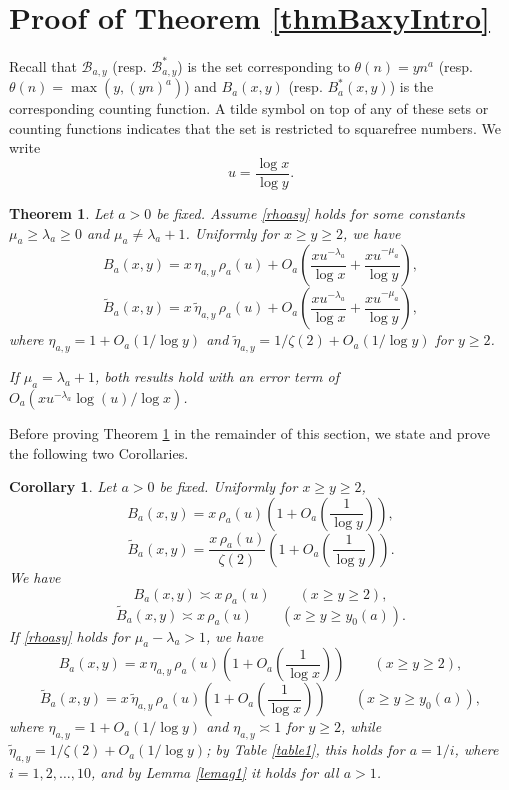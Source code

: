 \documentclass[11pt]{amsart}
\newtheorem{theorem}{Theorem}
\newtheorem{corollary}{Corollary}
\begin{document}
\section{Proof of Theorem \ref{thmBaxyIntro}}\label{secBaxy}
Recall that  $\mathcal{B}_{a,y}$ (resp. $\mathcal{B}^*_{a,y}$)  is the set corresponding to $\theta(n) = y n^{a}$ (resp. $\theta(n) = \max(y, (yn)^{a})$) and $B_{a}(x,y)$ (resp. $B^*_{a}(x,y)$) is the corresponding counting function.
A tilde symbol on top of any of these sets or counting functions indicates that the set is restricted to squarefree numbers. 
We write
$$
u=\frac{\log x}{\log y}.
$$

\begin{theorem}\label{thmBaxy}
Let $a>0$ be fixed. Assume \eqref{rhoasy} holds for some constants $\mu_a \ge \lambda_a \ge 0$ and $\mu_a\neq \lambda_a+1$. 
Uniformly for $x\ge y\ge 2$, we have
$$
B_a(x,y) = x \, \eta_{a,y} \, \rho_a(u) +O_a\left(\frac{x u^{-\lambda_a}}{\log x} +\frac{x u^{-\mu_a}}{\log y}\right),
$$
$$
\tilde{B}_a(x,y) = x \, \tilde{\eta}_{a,y} \, \rho_a(u) +O_a\left(\frac{x u^{-\lambda_a}}{\log x} +\frac{x u^{-\mu_a}}{\log y}\right),
$$
where $\eta_{a,y} =1+O_a(1/\log y)$ and $\tilde{\eta}_{a,y} =1/\zeta(2)+O_a(1/\log y)$  for $y\ge 2$.

If  $\mu_a = \lambda_a+1$, both results hold with an error term of $O_a(x u^{-\lambda_a} \log(u)/\log x)$. 
\end{theorem}

Before proving Theorem \ref{thmBaxy} in the remainder of this section, we state and prove the following two Corollaries. 

\begin{corollary}\label{cor1Baxy}
Let $a>0$ be fixed. Uniformly for $x\ge y\ge 2$, 
$$
B_a(x,y) = x \, \rho_a(u) \left(1+O_a\left(\frac{1}{\log y} \right)\right) ,
$$
$$
\tilde{B}_a(x,y) = \frac{x \, \rho_a(u)}{\zeta(2)} \left(1+O_a\left(\frac{1}{\log y} \right)\right).
$$
We have
$$
B_a(x,y) \asymp x \, \rho_a(u)  \qquad (x\ge y\ge 2),
$$
$$
\tilde{B}_a(x,y) \asymp x \, \rho_a(u)  \qquad (x\ge y\ge y_0(a)).
$$
If  \eqref{rhoasy} holds for $\mu_a-\lambda_a >1$, we have
$$
B_a(x,y) = x \, \eta_{a,y} \, \rho_a(u) \left(1+O_a\left(\frac{1}{\log x} \right)\right)  \qquad (x\ge y\ge 2),
$$
$$
\tilde{B}_a(x,y) = x \, \tilde{\eta}_{a,y} \, \rho_a(u) \left(1+O_a\left(\frac{1}{\log x} \right)\right) \qquad (x\ge y\ge y_0(a)),
$$
where $\eta_{a,y} = 1+O_a(1/\log y)$ and $\eta_{a,y} \asymp 1$ for $y\ge 2$, while  $\tilde{\eta}_{a,y} =1/\zeta(2)+O_a(1/\log y)$;
by Table \ref{table1}, this holds for $a=1/i$, where $i=1,2,\ldots, 10$, and by Lemma \ref{lemag1} it holds for all $a>1$.
\end{corollary}
\end{document}
